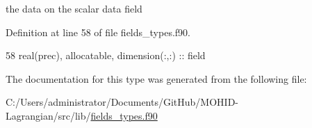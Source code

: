 the data on the scalar data field 



Definition at line 58 of file fields\+\_\+types.\+f90.


\begin{DoxyCode}
58         \textcolor{keywordtype}{real(prec)}, \textcolor{keywordtype}{allocatable}, \textcolor{keywordtype}{dimension(:,:)} :: field
\end{DoxyCode}


The documentation for this type was generated from the following file\+:\begin{DoxyCompactItemize}
\item 
C\+:/\+Users/administrator/\+Documents/\+Git\+Hub/\+M\+O\+H\+I\+D-\/\+Lagrangian/src/lib/\mbox{\hyperlink{fields__types_8f90}{fields\+\_\+types.\+f90}}\end{DoxyCompactItemize}
